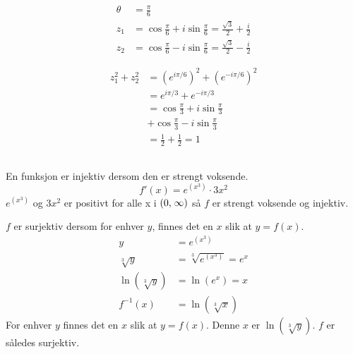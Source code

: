 \documentclass[defaultpackages]{cheatsheet}
\newcommand*{\skippingparagraph}{\par\vspace{\baselineskip}\noindent}
\begin{document}
\subsubsection{}
\begin{align*}
	\theta&=\frac{\pi}{6}\\
	z_1 &= \cos\frac{\pi}{6} + i\sin\frac{\pi}{6} = \frac{\sqrt{3}}{2} + \frac{i}{2}\\
	z_2 &= \cos\frac{\pi}{6} - i\sin\frac{\pi}{6} = \frac{\sqrt{3}}{2} - \frac{i}{2}
\end{align*}
{}
\begin{align*}
	z_1^2 + z_2^2 &= \left(e^{i\pi/6}\right)^2 + \left(e^{-i\pi/6}\right)^2\\
	&=e^{i\pi/3}+e^{-i\pi/3}\\
	&=\cos\frac{\pi}{3}+i\sin\frac{\pi}{3}\\&+\cos\frac{\pi}{3}-i\sin\frac{\pi}{3}\\
	&=\frac{1}{2} + \frac{1}{2} = 1
\end{align*}

\subsection{}
\subsubsection{}

En funksjon er injektiv dersom den er strengt voksende.
$$f'(x) = e^{\left(x^3\right)} \cdot 3x^2$$
$e^{\left(x^3\right)}$ og $3x^2$ er positivt for alle x i $\interval({0,\; \infty})$ så $f$ er strengt voksende og injektiv.
\skippingparagraph
$f$ er surjektiv dersom for enhver $y$, finnes det en $x$ slik at $y=f(x)$.
\begin{align*}
	y&=e^{\left(x^3\right)}\\
	\sqrt[3]{y}&=\sqrt[3]{e^{\left(x^3\right)}} = e^x\\
	\ln\left(\sqrt[3]{y}\right) &= \ln(e^x) = x\\
	f^{-1}(x) &= \ln\left(\sqrt[3]{x}\right)
\end{align*}
\noindent
For enhver $y$ finnes det en $x$ slik at $y=f(x)$. Denne $x$ er $\ln\left(\sqrt[3]{y}\right)$. $f$ er således surjektiv.
\end{document}
